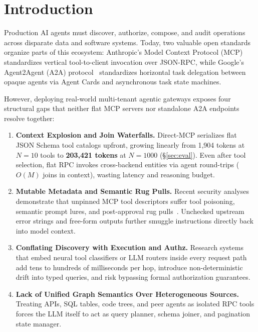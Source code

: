 \documentclass[10pt,twocolumn]{article}
\begin{document}
\section{Introduction}
\label{sec:intro}

Production AI agents must discover, authorize, compose, and audit operations across disparate data and software systems. Today, two valuable open standards organize parts of this ecosystem: Anthropic's Model Context Protocol (MCP)~\cite{anthropic2024mcp} standardizes vertical tool-to-client invocation over JSON-RPC, while Google's Agent2Agent (A2A) protocol~\cite{google2025a2a} standardizes horizontal task delegation between opaque agents via Agent Cards and asynchronous task state machines.

However, deploying real-world multi-tenant agentic gateways exposes four structural gaps that neither flat MCP servers nor standalone A2A endpoints resolve together:
\begin{enumerate}
  \item \textbf{Context Explosion and Join Waterfalls.} Direct-MCP serializes flat JSON Schema tool catalogs upfront, growing linearly from 1,904 tokens at $N=10$ tools to \textbf{203,421 tokens} at $N=1000$ (\S\ref{sec:eval}). Even after tool selection, flat RPC invokes cross-backend entities via agent round-trips ($O(M)$ joins in context), wasting latency and reasoning budget.
  \item \textbf{Mutable Metadata and Semantic Rug Pulls.} Recent security analyses demonstrate that unpinned MCP tool descriptors suffer tool poisoning, semantic prompt lures, and post-approval rug pulls~\cite{song2025beyond,wang2025mcptox,arxiv2512_06556}. Unchecked upstream error strings and free-form outputs further smuggle instructions directly back into model context.
  \item \textbf{Conflating Discovery with Execution and Authz.} Research systems that embed neural tool classifiers or LLM routers inside every request path add tens to hundreds of milliseconds per hop, introduce non-deterministic drift into typed queries, and risk bypassing formal authorization guarantees.
  \item \textbf{Lack of Unified Graph Semantics Over Heterogeneous Sources.} Treating APIs, SQL tables, code trees, and peer agents as isolated RPC tools forces the LLM itself to act as query planner, schema joiner, and pagination state manager.
\end{enumerate}
\end{document}
